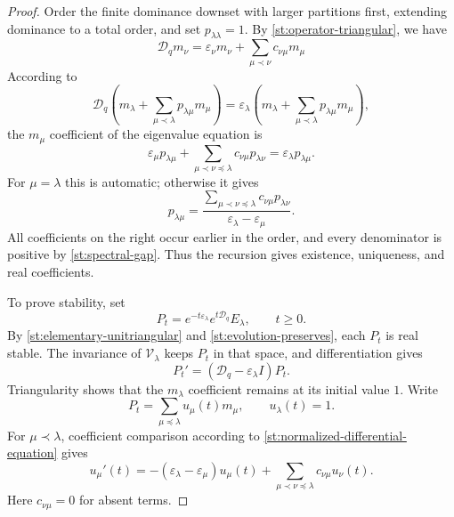 \documentclass[10pt,a4paper]{amsart}
\begin{document}
\begin{proof}
Order the finite dominance downset with larger partitions first,
extending dominance to a total order, and set
$p_{\lambda\lambda}=1$.
By \cref{st:operator-triangular}, we have
$$\mathcal D_q m_\nu=\varepsilon_\nu m_\nu+\sum_{\mu\prec\nu}c_{\nu\mu}m_\mu$$
According to
$$\mathcal D_q\left(m_\lambda+\sum_{\mu\prec\lambda}p_{\lambda\mu}m_\mu\right)=\varepsilon_\lambda \left(m_\lambda+\sum_{\mu\prec\lambda}p_{\lambda\mu}m_\mu\right),$$
the $m_\mu$ coefficient of the eigenvalue equation is
\[\varepsilon_\mu p_{\lambda\mu}+\sum_{\mu\prec\nu\preceq\lambda}c_{\nu\mu}p_{\lambda\nu}=\varepsilon_\lambda p_{\lambda\mu}.
\]
For $\mu=\lambda$ this is automatic; otherwise it gives
\begin{equation}\label{st:eigenfunction-recursion}
p_{\lambda\mu}
=\frac{\displaystyle\sum_{\mu\prec\nu\preceq\lambda}
        c_{\nu\mu}p_{\lambda\nu}}
       {\varepsilon_\lambda-\varepsilon_\mu}.
\end{equation}
All coefficients on the right occur earlier in the order, and every
denominator is positive by \cref{st:spectral-gap}.
Thus the recursion gives existence, uniqueness, and real coefficients.

To prove stability, set
\begin{equation}\label{st:normalized-evolution}
P_t=e^{-t\varepsilon_\lambda}
       e^{t\mathcal D_q}E_\lambda,
\qquad t\geq0.
\end{equation}
By \cref{st:elementary-unitriangular} and \cref{st:evolution-preserves}, each $P_t$ is real stable.
The invariance of $\mathcal V_\lambda$ keeps $P_t$ in that space,
and differentiation gives
\begin{equation}\label{st:normalized-differential-equation}
P_t'=(\mathcal D_q-\varepsilon_\lambda I)P_t.
\end{equation}
Triangularity shows that the $m_\lambda$ coefficient remains
at its initial value $1$.  Write
\[
P_t=\sum_{\mu\preceq\lambda}u_\mu(t)m_\mu,
\qquad u_\lambda(t)=1.
\]
For $\mu\prec\lambda$, coefficient comparison according to \eqref{st:normalized-differential-equation} gives
\begin{equation}\label{st:coefficient-evolution}
u_\mu'(t)
=-(\varepsilon_\lambda-\varepsilon_\mu)u_\mu(t)
  +\sum_{\mu\prec\nu\preceq\lambda}
      c_{\nu\mu}u_\nu(t).
\end{equation}
Here $c_{\nu\mu}=0$ for absent terms.


\end{proof}
\end{document}
